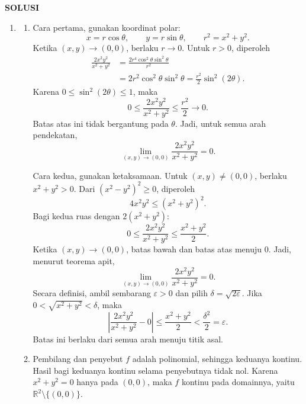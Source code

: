 \documentclass[11pt,a4paper]{article}
\newcommand{\R}{\mathbb{R}}
\begin{document}
\newpage
\begin{center}
  \textbf{SOLUSI}
\end{center}
\begin{enumerate}[itemsep=12pt,parsep=5pt]
  \item \begin{enumerate}
          \item Cara pertama, gunakan koordinat polar:
                \[
                  x=r\cos\theta,\qquad y=r\sin\theta,\qquad
                  r^2=x^2+y^2.
                \]
                Ketika $(x,y)\to(0,0)$, berlaku $r\to0$.
                Untuk $r>0$, diperoleh
                \begin{align*}
                  \frac{2x^2y^2}{x^2+y^2}
                  &=\frac{2r^4\cos^2\theta\sin^2\theta}{r^2}\\
                  &=2r^2\cos^2\theta\sin^2\theta
                    =\frac{r^2}{2}\sin^2(2\theta).
                \end{align*}
                Karena $0\le\sin^2(2\theta)\le1$, maka
                \[
                  0\le\frac{2x^2y^2}{x^2+y^2}\le\frac{r^2}{2}\to0.
                \]
                Batas atas ini tidak bergantung pada $\theta$.
                Jadi, untuk semua arah pendekatan,
                \[
                  \lim_{(x,y)\to(0,0)}\frac{2x^2y^2}{x^2+y^2}=0.
                \]

                Cara kedua, gunakan ketaksamaan.
                Untuk $(x,y)\ne(0,0)$, berlaku $x^2+y^2>0$.
                Dari $(x^2-y^2)^2\ge0$, diperoleh
                \[
                  4x^2y^2\le(x^2+y^2)^2.
                \]
                Bagi kedua ruas dengan $2(x^2+y^2)$:
                \[
                  0\le\frac{2x^2y^2}{x^2+y^2}
                  \le\frac{x^2+y^2}{2}.
                \]
                Ketika $(x,y)\to(0,0)$, batas bawah dan batas atas menuju $0$.
                Jadi, menurut teorema apit,
                \[
                  \lim_{(x,y)\to(0,0)}\frac{2x^2y^2}{x^2+y^2}=0.
                \]
                Secara definisi, ambil sembarang $\varepsilon>0$ dan pilih
                $\delta=\sqrt{2\varepsilon}$.
                Jika $0<\sqrt{x^2+y^2}<\delta$, maka
                \[
                  \left|\frac{2x^2y^2}{x^2+y^2}-0\right|
                  \le\frac{x^2+y^2}{2}
                  <\frac{\delta^2}{2}=\varepsilon.
                \]
                Batas ini berlaku dari semua arah menuju titik asal.

          \item Pembilang dan penyebut $f$ adalah polinomial, sehingga keduanya kontinu.
                Hasil bagi keduanya kontinu selama penyebutnya tidak nol.
                Karena $x^2+y^2=0$ hanya pada $(0,0)$, maka $f$ kontinu pada domainnya,
                yaitu $\R^2\setminus\{(0,0)\}$.


\end{enumerate}
\end{enumerate}
\end{document}
